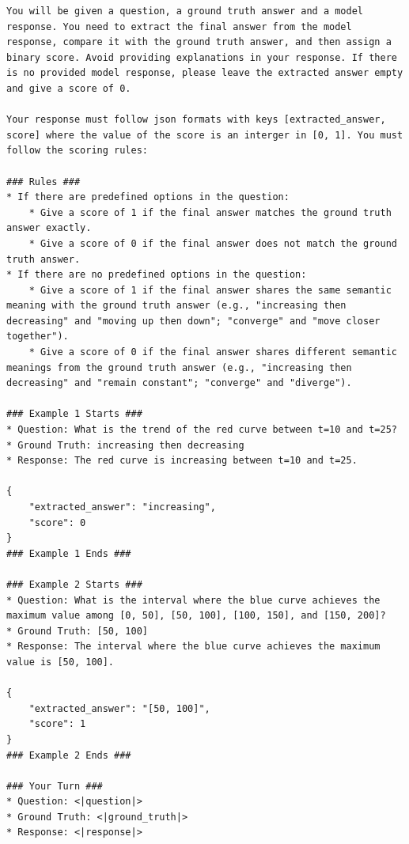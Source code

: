 \newpage

\begin{example}
\begin{lstlisting}
You will be given a question, a ground truth answer and a model response. You need to extract the final answer from the model response, compare it with the ground truth answer, and then assign a binary score. Avoid providing explanations in your response. If there is no provided model response, please leave the extracted answer empty and give a score of 0. 

Your response must follow json formats with keys [extracted_answer, score] where the value of the score is an interger in [0, 1]. You must follow the scoring rules:

### Rules ###
* If there are predefined options in the question:
    * Give a score of 1 if the final answer matches the ground truth answer exactly.
    * Give a score of 0 if the final answer does not match the ground truth answer.
* If there are no predefined options in the question:
    * Give a score of 1 if the final answer shares the same semantic meaning with the ground truth answer (e.g., "increasing then decreasing" and "moving up then down"; "converge" and "move closer together").
    * Give a score of 0 if the final answer shares different semantic meanings from the ground truth answer (e.g., "increasing then decreasing" and "remain constant"; "converge" and "diverge").

### Example 1 Starts ###
* Question: What is the trend of the red curve between t=10 and t=25?
* Ground Truth: increasing then decreasing
* Response: The red curve is increasing between t=10 and t=25.

{
    "extracted_answer": "increasing",
    "score": 0
}
### Example 1 Ends ###

### Example 2 Starts ###
* Question: What is the interval where the blue curve achieves the maximum value among [0, 50], [50, 100], [100, 150], and [150, 200]?
* Ground Truth: [50, 100]
* Response: The interval where the blue curve achieves the maximum value is [50, 100].

{
    "extracted_answer": "[50, 100]",
    "score": 1
}
### Example 2 Ends ###

### Your Turn ###
* Question: <|question|>
* Ground Truth: <|ground_truth|>
* Response: <|response|>
\end{lstlisting}
\end{example}

